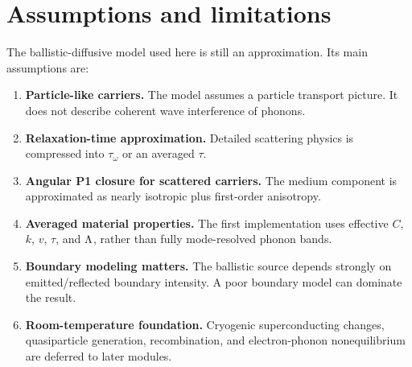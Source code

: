 \documentclass[11pt]{article}
\begin{document}
\section{Assumptions and limitations}
The ballistic-diffusive model used here is still an approximation. Its main assumptions are:
\begin{enumerate}[leftmargin=1.6em]
    \item \textbf{Particle-like carriers.} The model assumes a particle transport picture. It does not describe coherent wave interference of phonons.
    \item \textbf{Relaxation-time approximation.} Detailed scattering physics is compressed into \(\tau_\omega\) or an averaged \(\tau\).
    \item \textbf{Angular P1 closure for scattered carriers.} The medium component is approximated as nearly isotropic plus first-order anisotropy.
    \item \textbf{Averaged material properties.} The first implementation uses effective \(C\), \(k\), \(v\), \(\tau\), and \(\Lambda\), rather than fully mode-resolved phonon bands.
    \item \textbf{Boundary modeling matters.} The ballistic source depends strongly on emitted/reflected boundary intensity. A poor boundary model can dominate the result.
    \item \textbf{Room-temperature foundation.} Cryogenic superconducting changes, quasiparticle generation, recombination, and electron-phonon nonequilibrium are deferred to later modules.
\end{enumerate}
\end{document}
